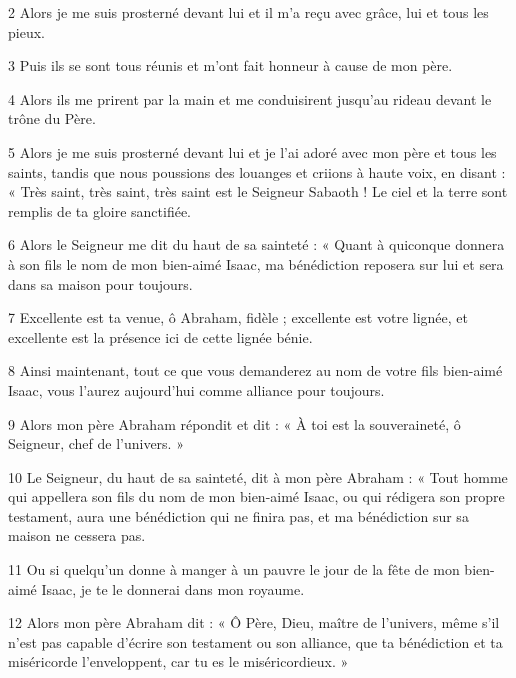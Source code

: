 \par 2 Alors je me suis prosterné devant lui et il m'a reçu avec grâce, lui et tous les pieux.

\par 3 Puis ils se sont tous réunis et m'ont fait honneur à cause de mon père.

\par 4 Alors ils me prirent par la main et me conduisirent jusqu'au rideau devant le trône du Père.

\par 5 Alors je me suis prosterné devant lui et je l'ai adoré avec mon père et tous les saints, tandis que nous poussions des louanges et criions à haute voix, en disant : « Très saint, très saint, très saint est le Seigneur Sabaoth ! Le ciel et la terre sont remplis de ta gloire sanctifiée.

\par 6 Alors le Seigneur me dit du haut de sa sainteté : « Quant à quiconque donnera à son fils le nom de mon bien-aimé Isaac, ma bénédiction reposera sur lui et sera dans sa maison pour toujours.

\par 7 Excellente est ta venue, ô Abraham, fidèle ; excellente est votre lignée, et excellente est la présence ici de cette lignée bénie.

\par 8 Ainsi maintenant, tout ce que vous demanderez au nom de votre fils bien-aimé Isaac, vous l'aurez aujourd'hui comme alliance pour toujours.

\par 9 Alors mon père Abraham répondit et dit : « À toi est la souveraineté, ô Seigneur, chef de l'univers. »

\par 10 Le Seigneur, du haut de sa sainteté, dit à mon père Abraham : « Tout homme qui appellera son fils du nom de mon bien-aimé Isaac, ou qui rédigera son propre testament, aura une bénédiction qui ne finira pas, et ma bénédiction sur sa maison ne cessera pas.

\par 11 Ou si quelqu'un donne à manger à un pauvre le jour de la fête de mon bien-aimé Isaac, je te le donnerai dans mon royaume.

\par 12 Alors mon père Abraham dit : « Ô Père, Dieu, maître de l'univers, même s'il n'est pas capable d'écrire son testament ou son alliance, que ta bénédiction et ta miséricorde l'enveloppent, car tu es le miséricordieux. »

